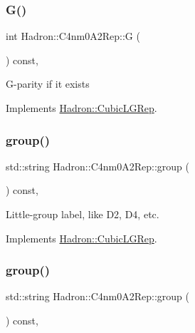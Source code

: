 \subsubsection{\texorpdfstring{G()}{G()}\hspace{0.1cm}{\footnotesize\ttfamily [3/3]}}
{\footnotesize\ttfamily int Hadron\+::\+C4nm0\+A2\+Rep\+::G (\begin{DoxyParamCaption}{ }\end{DoxyParamCaption}) const\hspace{0.3cm}{\ttfamily [inline]}, {\ttfamily [virtual]}}

G-\/parity if it exists 

Implements \mbox{\hyperlink{structHadron_1_1CubicLGRep_ace26f7b2d55e3a668a14cb9026da5231}{Hadron\+::\+Cubic\+L\+G\+Rep}}.

\mbox{\label{structHadron_1_1C4nm0A2Rep_aaba4ff31952a682fa280fc4c8803dbc3}} 
\subsubsection{\texorpdfstring{group()}{group()}\hspace{0.1cm}{\footnotesize\ttfamily [1/5]}}
{\footnotesize\ttfamily std\+::string Hadron\+::\+C4nm0\+A2\+Rep\+::group (\begin{DoxyParamCaption}{ }\end{DoxyParamCaption}) const\hspace{0.3cm}{\ttfamily [inline]}, {\ttfamily [virtual]}}

Little-\/group label, like D2, D4, etc. 

Implements \mbox{\hyperlink{structHadron_1_1CubicLGRep_a9bdb14b519a611d21379ed96a3a9eb41}{Hadron\+::\+Cubic\+L\+G\+Rep}}.

\mbox{\label{structHadron_1_1C4nm0A2Rep_aaba4ff31952a682fa280fc4c8803dbc3}} 
\subsubsection{\texorpdfstring{group()}{group()}\hspace{0.1cm}{\footnotesize\ttfamily [2/5]}}
{\footnotesize\ttfamily std\+::string Hadron\+::\+C4nm0\+A2\+Rep\+::group (\begin{DoxyParamCaption}{ }\end{DoxyParamCaption}) const\hspace{0.3cm}{\ttfamily [inline]}, {\ttfamily [virtual]}}

